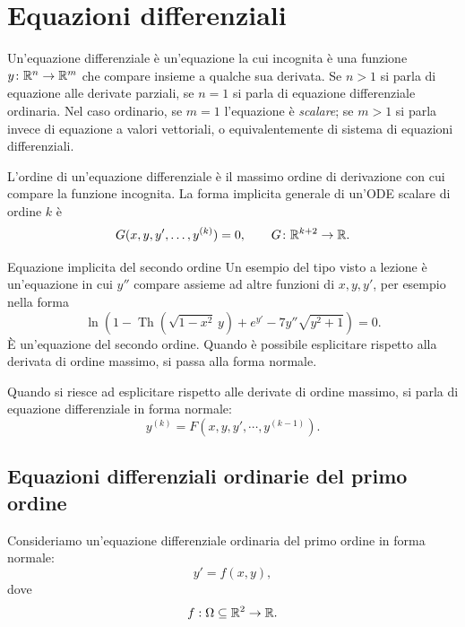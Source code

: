 \documentclass[a4paper]{article}
\begin{document}
\pagebreak

\section{Equazioni differenziali}

\begin{radioactive}
Un'equazione differenziale è un'equazione la cui incognita è una funzione
\(y\colon \mathbb{R}^n \to \mathbb{R}^m\) che compare insieme a qualche sua derivata.
Se \(n>1\) si parla di equazione alle derivate parziali, se \(n=1\) si parla di equazione differenziale ordinaria.
Nel caso ordinario, se \(m=1\) l'equazione è \emph{scalare}; se \(m>1\) si parla invece
 di equazione a valori vettoriali, o equivalentemente di sistema di equazioni differenziali.

L'ordine di un'equazione differenziale è il massimo ordine di derivazione con cui compare
la funzione incognita. La forma implicita generale di un'ODE scalare di ordine \(k\) è
\[
    G(x,y,y',\ldots,y^{(k)})=0,
    \qquad
    G\colon\mathbb{R}^{k+2}\to\mathbb{R}.
\]
\end{radioactive}

\begin{radioactive}
\begin{snippetexample}{Equazione implicita del secondo ordine}
    Un esempio del tipo visto a lezione è un'equazione in cui \(y''\) compare assieme ad altre
    funzioni di \(x,y,y'\), per esempio nella forma
    \[
        \ln\left(1-\operatorname{Th}\!\left(\sqrt{1-x^2}\,y\right)+e^{y'}-7y''\sqrt{y^2+1}\right)=0.
    \]
    È un'equazione del secondo ordine. Quando è possibile esplicitare rispetto alla derivata
    di ordine massimo, si passa alla forma normale.
\end{snippetexample}
\end{radioactive}

\begin{radioactive}
Quando si riesce ad esplicitare rispetto alle derivate di ordine massimo,
si parla di equazione differenziale in forma normale:
\[
    y^{(k)} = F(x,y,y', \cdots, y^{(k-1)}).
\]
\end{radioactive}

\subsection{Equazioni differenziali ordinarie del primo ordine}
\begin{radioactive}
Consideriamo un'equazione differenziale ordinaria del primo ordine in forma normale:
\[
    y'=f(x,y),
\]
dove
\[
    f:\Omega \subseteq \mathbb{R}^2 \to \mathbb{R}.
\]
\end{radioactive}
\end{document}
